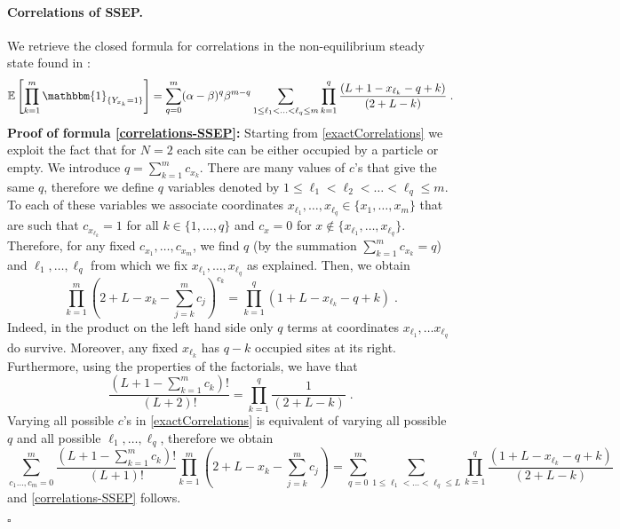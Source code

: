 \documentclass[10pt]{article}
\numberwithin{equation}{section}
\numberwithin{equation}{subsection}
\newcommand{\dt}{\;.}
\begin{document}
\paragraph{Correlations of SSEP.}
We retrieve the closed formula for correlations in the non-equilibrium steady state found in \cite[(4.26)]{frassek2020eigenstates}:  
\begin{equation}\label{correlations-SSEP}
	\mathbb{E}\left[\prod_{k=1}^{m}\mathbbm{1}_{\{Y_{x_{k}}=1\}}\right]=\sum_{q=0}^{m}(\alpha-\beta)^{q}\beta^{m-q}\sum_{1\leq \ell_{1}<\ldots<\ell_{q}\leq m}\prod_{k=1}^{q}\frac{\left(L+1-x_{\ell_{k}}-q+k\right)}{(2+L-k)}\dt
\end{equation} 
\textbf{Proof of formula \eqref{correlations-SSEP}:} Starting from \eqref{exactCorrelations} we exploit {the fact that for $N=2$  each site can be either occupied by a particle or empty.} 
We introduce $q=\sum_{k=1}^{m}c_{x_{k}}$. There are many values of $c$'s that give the same $q$, therefore we define $q$ variables denoted by  %
$1\leq \ell_{1}<\ell_{2}<\ldots<\ell_{q}\leq m$.  
To each of these variables we associate coordinates $x_{\ell_{1}},\ldots,x_{\ell_{q}}\in\{x_{1},\dots,x_{m}\}$ that are such that $c_{x_{\ell_{k}}}=1$ for all $k\in \{1,\ldots,q\}$ and $c_{x}=0$ for $x\notin \{x_{\ell_{1}},\ldots,x_{\ell_{q}}\}$. Therefore, for any fixed $c_{x_{1}},\ldots,c_{x_{m}}$, we find $q$ { (by the summation $\textstyle{\sum_{k=1}^{m}}c_{x_{k}}=q$)} %
 and $\ell_{1},\ldots,\ell_{q}$ from which we fix $x_{\ell_{1}},\ldots,x_{\ell_{q}}$ { as explained.} Then, we obtain  
	\begin{equation}
		\prod_{k=1}^{m}\left(2+L-x_{k}-\sum_{j=k}^{m}c_{j}\right)^{c_{k}}=\prod_{k=1}^{q}\left(1+L-x_{\ell_{k}}-q+k\right)\dt
	\end{equation}
Indeed, in the product on the left hand side only $q$ terms at coordinates $x_{\ell_{1}},\ldots x_{\ell_{q}}$ do survive. Moreover, any fixed $x_{\ell_{k}}$ has $q-k$ occupied sites at its right.
Furthermore, using the properties of the factorials, we have that 
\begin{equation}\label{Gamma-product}
	\frac{(L+1-\sum_{k=1}^{m}c_{k})!}{(L+2)!}=\prod_{k=1}^{q}\frac{1}{(2+L-k)}\dt
\end{equation}
Varying all possible $c$'s in \eqref{exactCorrelations} is equivalent of varying all possible $q$ and all possible $\ell_{1},\ldots,\ell_{q}$, therefore we obtain 
\begin{equation}
	\sum_{c_{1}\ldots,c_{m}=0}^{m}\frac{(L+1-\sum_{k=1}^{m}c_{k})!}{(L+1)!}\prod_{k=1}^{m}\left(2+L-x_{k}-\sum_{j=k}^{m}c_{j}\right)=\sum_{q=0}^{m}\sum_{1\leq \ell_{1}<\ldots<\ell_{q}\leq L}\prod_{k=1}^{q}\frac{(1+L-x_{\ell_{k}}-q+k)}{(2+L-k)}
\end{equation} 
and \eqref{correlations-SSEP} follows. 
\begin{flushright}
	$\square$
\end{flushright}
\end{document}
